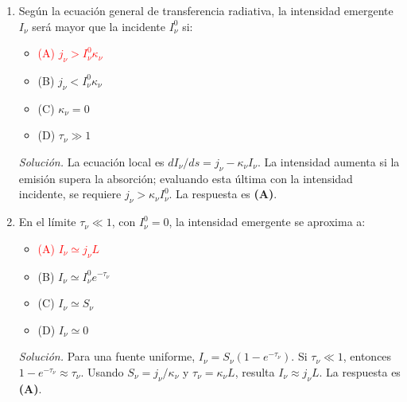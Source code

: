 \documentclass[11pt]{article}
\begin{document}
\begin{enumerate}
    \item Según la ecuación general de transferencia radiativa, la intensidad emergente $I_\nu$ será mayor que la incidente $I^0_\nu$ si:
    \begin{itemize}
        \item \textcolor{red}{(A) $j_\nu>I^0_\nu\kappa_\nu$}
        \item (B) $j_\nu<I^0_\nu\kappa_\nu$
        \item (C) $\kappa_\nu=0$
        \item (D) $\tau_\nu\gg1$
    \end{itemize}
    \textit{Solución.} La ecuación local es $dI_\nu/ds=j_\nu-\kappa_\nu I_\nu$. La intensidad aumenta si la emisión supera la absorción; evaluando esta última con la intensidad incidente, se requiere $j_\nu>\kappa_\nu I^0_\nu$. La respuesta es \textbf{(A)}. \parencite[Sec. 13.7, pp. 403--405]{chaparro2026}

    \item En el límite $\tau_\nu\ll1$, con $I^0_\nu=0$, la intensidad emergente se aproxima a:
    \begin{itemize}
        \item \textcolor{red}{(A) $I_\nu\simeq j_\nu L$}
        \item (B) $I_\nu\simeq I^0_\nu e^{-\tau_\nu}$
        \item (C) $I_\nu\simeq S_\nu$
        \item (D) $I_\nu\simeq0$
    \end{itemize}
    \textit{Solución.} Para una fuente uniforme, $I_\nu=S_\nu(1-e^{-\tau_\nu})$. Si $\tau_\nu\ll1$, entonces $1-e^{-\tau_\nu}\approx\tau_\nu$. Usando $S_\nu=j_\nu/\kappa_\nu$ y $\tau_\nu=\kappa_\nu L$, resulta $I_\nu\approx j_\nu L$. La respuesta es \textbf{(A)}. \parencite[Sec. 13.7, pp. 403--405]{chaparro2026}


\end{enumerate}
\end{document}

